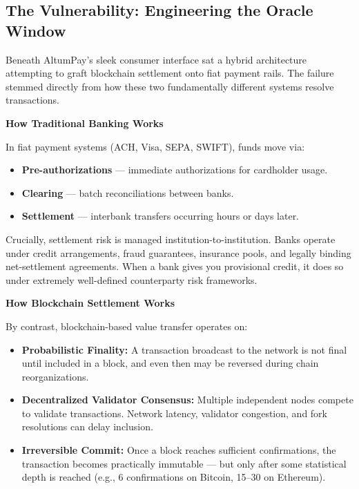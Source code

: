 \subsection{The Vulnerability: Engineering the Oracle Window}

Beneath AltumPay’s sleek consumer interface sat a hybrid architecture attempting to graft blockchain settlement onto fiat payment rails. The failure stemmed directly from how these two fundamentally different systems resolve transactions.

\bigskip

\textbf{How Traditional Banking Works}

In fiat payment systems (ACH, Visa, SEPA, SWIFT), funds move via:

\begin{itemize}
  \item \textbf{Pre-authorizations} — immediate authorizations for cardholder usage.
  \item \textbf{Clearing} — batch reconciliations between banks.
  \item \textbf{Settlement} — interbank transfers occurring hours or days later.
\end{itemize}

Crucially, settlement risk is managed institution-to-institution. Banks operate under credit arrangements, fraud guarantees, insurance pools, and legally binding net-settlement agreements. When a bank gives you provisional credit, it does so under extremely well-defined counterparty risk frameworks.

\bigskip

\textbf{How Blockchain Settlement Works}

By contrast, blockchain-based value transfer operates on:

\begin{itemize}
  \item \textbf{Probabilistic Finality:} A transaction broadcast to the network is not final until included in a block, and even then may be reversed during chain reorganizations.
  \item \textbf{Decentralized Validator Consensus:} Multiple independent nodes compete to validate transactions. Network latency, validator congestion, and fork resolutions can delay inclusion.
  \item \textbf{Irreversible Commit:} Once a block reaches sufficient confirmations, the transaction becomes practically immutable — but only after some statistical depth is reached (e.g., 6 confirmations on Bitcoin, 15--30 on Ethereum).
\end{itemize}

